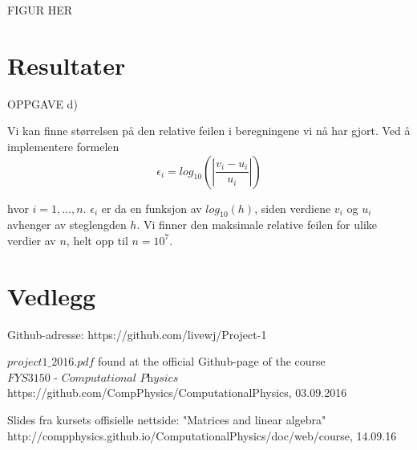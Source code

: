 \documentclass{article}
\begin{document}
FIGUR HER





\section{Resultater}
OPPGAVE d)

Vi kan finne størrelsen på den relative feilen i beregningene vi nå har gjort. Ved å implementere formelen 
\begin{equation}
\epsilon_i = log_{10} \left(\left| \frac{v_i - u_i}{u_i} \right| \right)
\end{equation} 

hvor $i = 1,...,n$. $\epsilon_i$ er da en funksjon av $log_{10}(h)$, siden verdiene $v_i$ og $u_i$ avhenger av steglengden $h$. Vi finner den maksimale relative feilen for ulike verdier av $n$, helt opp til $n=10^7$.


\section{Vedlegg}
Github-adresse: https://github.com/livewj/Project-1

%




\begin{thebibliography}{9}

  $project1\_2016.pdf$
  found at the official Github-page of the course $\textit{FYS3150 - Computational Physics}$
  https://github.com/CompPhysics/ComputationalPhysics,
  03.09.2016
  
\bibitem{}
  Slides fra kursets offisielle nettside: "Matrices and linear algebra" http://compphysics.github.io/ComputationalPhysics/doc/web/course, 14.09.16
  
    
\end{thebibliography}
\end{document}
